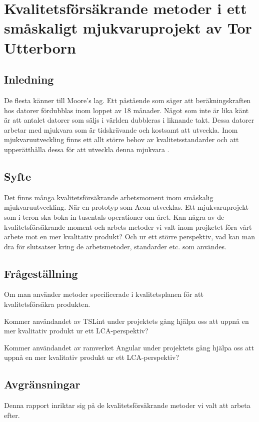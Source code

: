 \chapter{Kvalitetsförsäkrande metoder i ett småskaligt mjukvaruprojekt av Tor Utterborn}

\section{Inledning}

De flesta känner till Moore's lag. Ett påstående som säger att beräkningskraften hos datorer fördubblas inom loppet av 18 månader. 
Något som inte är lika känt är att antalet datorer som säljs i världen dubbleras i liknande takt. \cite{greenbiz}
Dessa datorer arbetar med mjukvara som är tidskrävande och kostsamt att utveckla. Inom mjukvaruutveckling finns ett allt större behov av kvalitetsstandarder och att upperätthålla dessa för att utveckla denna mjukvara \cite{linkedin}.

\section{Syfte}

Det finns många kvalitetsförsäkrande arbetsmoment inom småskalig mjukvaruutveckling. När en prototyp som Aeon utvecklas. Ett mjukvaruprojekt som i teron ska boka in tusentals operationer om året. Kan några av de kvalitetsförsäkrande moment och arbets metoder vi valt inom projketet föra vårt arbete mot en mer kvalitativ produkt? Och ur ett större perspektiv, vad kan man dra för slutsatser kring de arbetsmetoder, standarder etc. som användes.

\section{Frågeställning}

Om man använder metoder specificerade i kvalitetsplanen för att kvalitetsförsäkra produkten. 

Kommer användandet av TSLint under projektets gång hjälpa oss att uppnå en mer kvalitativ produkt ur ett LCA-perspektiv?

Kommer användandet av ramverket Angular under projektets gång hjälpa oss att uppnå en mer kvalitativ produkt ur ett LCA-perspektiv?

\section{Avgränsningar}
Denna rapport inriktar sig på de kvalitetsförsäkrande metoder vi valt att arbeta efter.

